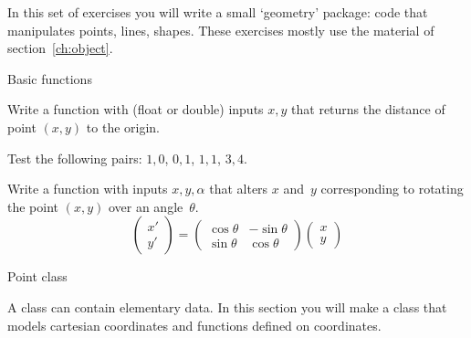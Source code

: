 
In this set of exercises you will write a small `geometry' package:
code that manipulates points, lines, shapes.
These exercises mostly use the material of section~\ref{ch:object}.

 {Basic functions}

\begin{exercise}
  \label{ex:pointdistance}
  Write a function with (float or double) inputs $x,y$ that returns the distance of
  point $(x,y)$ to the origin.

  Test the following pairs: $1,0$, $0,1$, $1,1$, $3,4$.
\end{exercise}

\begin{exercise}
  \label{ex:pointrotate}
  Write a function with inputs $x,y,\alpha$ that alters $x$ and~$y$
  corresponding to rotating the point $(x,y)$ over an angle~$\theta$.
  \[
  \begin{pmatrix}
    x'\\y'
  \end{pmatrix} =
  \begin{pmatrix}
    \cos\theta& -\sin\theta\\ \sin\theta&\cos\theta
  \end{pmatrix}
  \begin{pmatrix}
    x\\y
  \end{pmatrix}
  \]
\end{exercise}

 {Point class}
\label{ex:pointfunc}

\prerequisite{\ref{sec:object}}

A class can contain elementary data. In this section you will make a
 class that models cartesian coordinates and functions
defined on coordinates.

